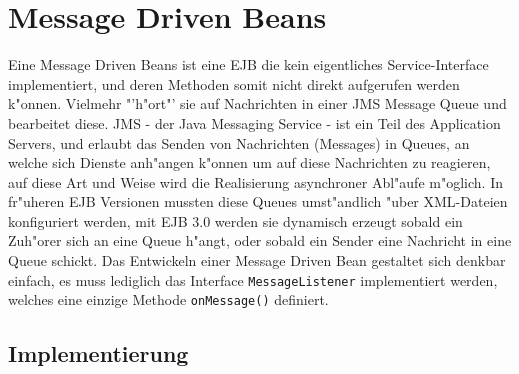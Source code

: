 \section{Message Driven Beans}
\label{sec:chap2:mdb}

Eine Message Driven Beans ist eine EJB die kein eigentliches Service-Interface implementiert,
und deren Methoden somit nicht direkt aufgerufen werden k"onnen. Vielmehr "'h"ort"' sie auf
Nachrichten in einer JMS Message Queue und bearbeitet diese.  JMS - der Java Messaging Service - 
ist ein Teil des Application Servers, und erlaubt das Senden von Nachrichten (Messages) in
Queues, an welche sich Dienste anh"angen k"onnen um auf diese Nachrichten zu reagieren,
auf diese Art und Weise wird die Realisierung asynchroner Abl"aufe m"oglich.
In fr"uheren EJB Versionen mussten diese Queues umst"andlich "uber XML-Dateien konfiguriert werden,
mit EJB 3.0 werden sie dynamisch erzeugt sobald ein Zuh"orer sich an eine Queue h"angt, oder
sobald ein Sender eine Nachricht in eine Queue schickt. Das Entwickeln einer Message Driven Bean 
gestaltet sich denkbar einfach, es muss lediglich das Interface \texttt{MessageListener} implementiert
werden, welches eine einzige Methode \texttt{onMessage()} definiert.

\subsection{Implementierung}
\label{sec:chap2:mdb:impl}

